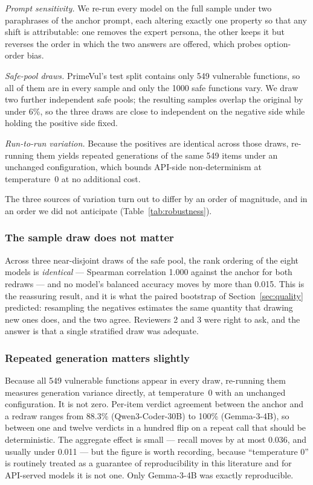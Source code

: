\documentclass[computers,article,submit,moreauthors]{Definitions/mdpi}
\begin{document}
\emph{Prompt sensitivity.} We re-run every model on the full sample under two paraphrases of the anchor prompt, each altering exactly one property so that any shift is attributable: one removes the expert persona, the other keeps it but reverses the order in which the two answers are offered, which probes option-order bias.

\emph{Safe-pool draws.} PrimeVul's test split contains only 549 vulnerable functions, so all of them are in every sample and only the 1000 safe functions vary. We draw two further independent safe pools; the resulting samples overlap the original by under 6\%, so the three draws are close to independent on the negative side while holding the positive side fixed.

\emph{Run-to-run variation.} Because the positives are identical across those draws, re-running them yields repeated generations of the same 549 items under an unchanged configuration, which bounds API-side non-determinism at temperature~0 at no additional cost.

The three sources of variation turn out to differ by an order of magnitude, and in an order we did not anticipate (Table~\ref{tab:robustness}).

\subsubsection*{The sample draw does not matter}
Across three near-disjoint draws of the safe pool, the rank ordering of the eight models is \emph{identical} --- Spearman correlation 1.000 against the anchor for both redraws --- and no model's balanced accuracy moves by more than 0.015. This is the reassuring result, and it is what the paired bootstrap of Section~\ref{sec:quality} predicted: resampling the negatives estimates the same quantity that drawing new ones does, and the two agree. Reviewers 2 and 3 were right to ask, and the answer is that a single stratified draw was adequate.

\subsubsection*{Repeated generation matters slightly}
Because all 549 vulnerable functions appear in every draw, re-running them measures generation variance directly, at temperature~0 with an unchanged configuration. It is not zero. Per-item verdict agreement between the anchor and a redraw ranges from 88.3\% (Qwen3-Coder-30B) to 100\% (Gemma-3-4B), so between one and twelve verdicts in a hundred flip on a repeat call that should be deterministic. The aggregate effect is small --- recall moves by at most 0.036, and usually under 0.011 --- but the figure is worth recording, because ``temperature 0'' is routinely treated as a guarantee of reproducibility in this literature and for API-served models it is not one. Only Gemma-3-4B was exactly reproducible.
\end{document}

